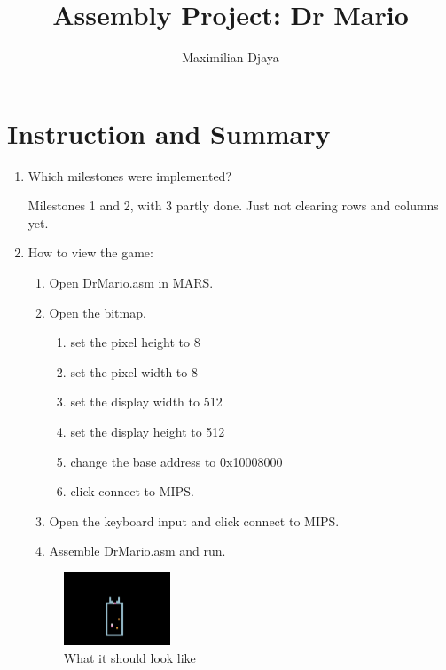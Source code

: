 \documentclass{article}
\title{Assembly Project: Dr Mario}
\author{Maximilian Djaya}
\begin{document}
\maketitle

\section{Instruction and Summary}

\begin{enumerate}

    \item Which milestones were implemented?
    
    Milestones 1 and 2, with 3 partly done. Just not clearing rows and columns yet.
    \item How to view the game:
    
    \begin{enumerate}

    \item Open DrMario.asm in MARS.
    \item Open the bitmap.
    \begin{enumerate}
        \item set the pixel height to 8
        \item set the pixel width to 8
        \item set the display width to 512
        \item set the display height to 512
        \item change the base address to 0x10008000
        \item click connect to MIPS.
    \end{enumerate}
    \item Open the keyboard input and click connect to MIPS.
    \item Assemble DrMario.asm and run.


    \end{enumerate}

    

\begin{figure}[ht!]
    \centering
    \includegraphics[width=0.3\textwidth]{initializedDrmario.png}
    \caption{What it should look like}
    \label{Instructions}
\end{figure}


\end{enumerate}
\end{document}
